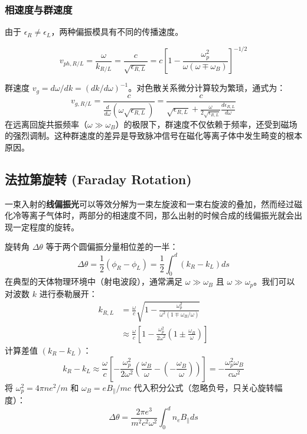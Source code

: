 \subsubsection{相速度与群速度}

由于 $\epsilon_R \neq \epsilon_L$，两种偏振模具有不同的传播速度。

\begin{equation}
    v_{ph, R/L} = \frac{\omega}{k_{R/L}} = \frac{c}{\sqrt{\epsilon_{R,L}}} = c \left[ 1 - \frac{\omega_p^2}{\omega(\omega \mp \omega_B)} \right]^{-1/2}
\end{equation}

群速度 $v_g = d\omega / dk = (dk/d\omega)^{-1}$。对色散关系微分计算较为繁琐，通式为：
\begin{equation}
    v_{g, R/L} = \frac{c}{\frac{d}{d\omega}(\omega \sqrt{\epsilon_{R,L}})} = \frac{c}{\sqrt{\epsilon_{R,L}} + \frac{\omega}{2\sqrt{\epsilon_{R,L}}} \frac{d\epsilon_{R,L}}{d\omega}}
\end{equation}
在远离回旋共振频率（$\omega \gg \omega_B$）的极限下，群速度不仅依赖于频率，还受到磁场的强烈调制。这种群速度的差异是导致脉冲信号在磁化等离子体中发生畸变的根本原因。

\subsection{法拉第旋转 (Faraday Rotation)}

一束入射的\textbf{线偏振光}可以等效分解为一束左旋波和一束右旋波的叠加，然而经过磁化冷等离子气体时，两部分的相速度不同，那么出射的时候合成的线偏振光就会出现一定程度的旋转。

旋转角 $\Delta \theta$ 等于两个圆偏振分量相位差的一半：
\begin{equation}
    \Delta \theta = \frac{1}{2} (\phi_R - \phi_L) = \frac{1}{2} \int_0^d (k_R - k_L) ds
\end{equation}
在典型的天体物理环境中（射电波段），通常满足 $\omega \gg \omega_B$ 且 $\omega \gg \omega_p$。我们可以对波数 $k$ 进行泰勒展开：
\begin{align}
    k_{R,L} &= \frac{\omega}{c} \sqrt{1 - \frac{\omega_p^2}{\omega^2(1 \mp \omega_B/\omega)}} \\
            &\approx \frac{\omega}{c} \left[ 1 - \frac{\omega_p^2}{2\omega^2} \left( 1 \pm \frac{\omega_B}{\omega} \right) \right]
\end{align}
计算差值 $(k_R - k_L)$：
\begin{equation}
    k_R - k_L \approx \frac{\omega}{c} \left[ - \frac{\omega_p^2}{2\omega^2} \left( \frac{\omega_B}{\omega} - \left( -\frac{\omega_B}{\omega} \right) \right) \right] = - \frac{\omega_p^2 \omega_B}{c \omega^2}
\end{equation}
将 $\omega_p^2 = 4\pi n e^2/m$ 和 $\omega_B = e B_\parallel / mc$ 代入积分公式（忽略负号，只关心旋转幅度）：
\begin{equation}
    \Delta \theta = \frac{2\pi e^3}{m^2 c^2 \omega^2} \int_0^d n_e B_\parallel ds
\end{equation}

